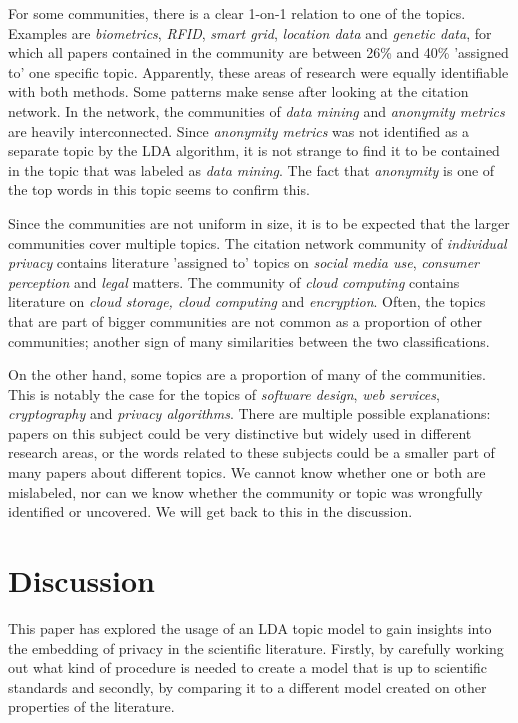 \documentclass[runningheads]{llncs}
\begin{document}
For some communities, there is a clear 1-on-1 relation to one of the topics. Examples are \textit{biometrics}, \textit{RFID}, \textit{smart grid}, \textit{location data} and \textit{genetic data}, for which all papers contained in the community are between 26\% and 40\% 'assigned to' one specific topic. Apparently, these areas of research were equally identifiable with both methods. Some patterns make sense after looking at the citation network. In the network, the communities of \textit{data mining} and \textit{anonymity metrics} are heavily interconnected. Since \textit{anonymity metrics} was not identified as a separate topic by the LDA algorithm, it is not strange to find it to be contained in the topic that was labeled as \textit{data mining}. The fact that \textit{anonymity} is one of the top words in this topic seems to confirm this.

Since the communities are not uniform in size, it is to be expected that the larger communities cover multiple topics. The citation network community of \textit{individual privacy} contains literature 'assigned to' topics on \textit{social media use}, \textit{consumer perception} and \textit{legal} matters. The community of \textit{cloud computing} contains literature on \textit{cloud storage, cloud computing} and \textit{encryption}. Often, the topics that are part of bigger communities are not common as a proportion of other communities; another sign of many similarities between the two classifications. 

On the other hand, some topics are a proportion of many of the communities. This is notably the case for the topics of \textit{software design}, \textit{web services}, \textit{cryptography} and \textit{privacy algorithms}. There are multiple possible explanations: papers on this subject could be very distinctive but widely used in different research areas, or the words related to these subjects could be a smaller part of many papers about different topics. We cannot know whether one or both are mislabeled, nor can we know whether the community or topic was wrongfully identified or uncovered. We will get back to this in the discussion.

\section{Discussion}
\label{discussion}
This paper has explored the usage of an LDA topic model to gain insights into the embedding of privacy in the scientific literature. Firstly, by carefully working out what kind of procedure is needed to create a model that is up to scientific standards and secondly, by comparing it to a different model created on other properties of the literature.
\end{document}
